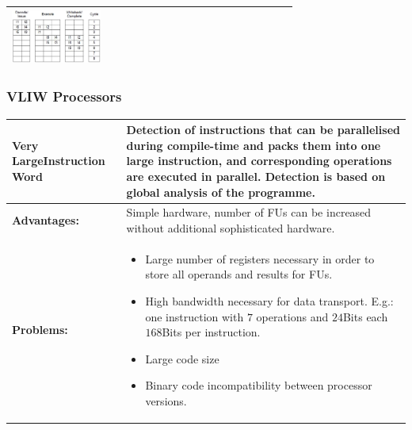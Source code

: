 \begin{longtable}{|>{\bfseries}p{}|p{}|p{}|}
						\includegraphics[width=0.35\textwidth]{./pictures/policyOutOfOrderOutOfOrder.png}\\
				\hline
			\end{longtable}
			
		\subsubsection{VLIW Processors}
			\begin{longtable}{|>{\bfseries}p{}|p{}|}
				\hline
				Very Large\newline Instruction Word
					& Detection of instructions that can be parallelised during compile-time and packs them into one large instruction, and corresponding operations are executed in parallel. Detection is based on global analysis of the programme.\\
				\hline
				Advantages:
					& Simple hardware, number of FUs can be increased without additional sophisticated hardware.\\
				\hline
				Problems:
					& \begin{itemize}
					    \item Large number of registers necessary in order to store all operands and results for FUs.
					    \item High bandwidth necessary for data transport.
					    	E.g.: one instruction with $7$ operations and $24$Bits each \textrightarrow\ $168$Bits per instruction.
					    \item Large code size
					    \item Binary code incompatibility between processor versions.
					\end{itemize}\\
				\hline
			\end{longtable}			
			
